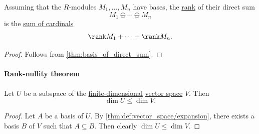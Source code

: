 \begin{proposition}\label{thm:rank_of_direct_sum}
  Assuming that the \( R \)-modules \( M_1, \ldots, M_n \) have bases, the \hyperref[def:module_rank]{rank} of their direct sum
  \begin{equation*}
    M_1 \oplus \cdots \oplus M_n
  \end{equation*}
  is the \hyperref[def:cardinal_addition]{sum of cardinals}
  \begin{equation*}
    \rank M_1 + \cdots + \rank M_n.
  \end{equation*}
\end{proposition}
\begin{proof}
  Follows from \cref{thm:basis_of_direct_sum}.
\end{proof}

\paragraph{Rank-nullity theorem}

\begin{lemma}\label{thm:vector_space_dimension_monotonicity}
  Let \( U \) be a subspace of the \hyperref[thm:vector_space_dimension]{finite-dimensional} \hyperref[def:vector_space]{vector space} \( V \). Then
  \begin{equation*}
    \dim U \leq \dim V.
  \end{equation*}
\end{lemma}
\begin{proof}
  Let \( A \) be a basis of \( U \). By \cref{thm:def:vector_space/expansion}, there exists a basis \( B \) of \( V \) such that \( A \subseteq B \). Then clearly \( \dim U \leq \dim V \).
\end{proof}

